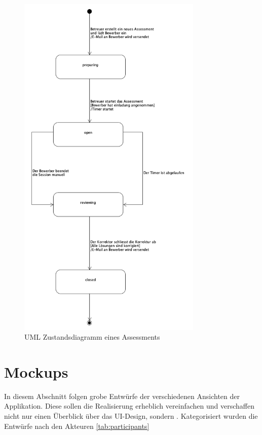 \begin{figure}[H]
    \centering
    \includegraphics[height=17cm]{images/diagrams/state.png}
    \caption{\label{fig:state-diagram}UML Zustandsdiagramm eines Assessments}
\end{figure}

\newpage

\section{Mockups}

In diesem Abschnitt folgen grobe Entwürfe der verschiedenen Ansichten der Applikation. Diese sollen die Realisierung
erheblich vereinfachen und verschaffen nicht nur einen Überblick über das UI-Design, sondern . Kategorisiert wurden die Entwürfe nach den Akteuren \ref{tab:participants}

